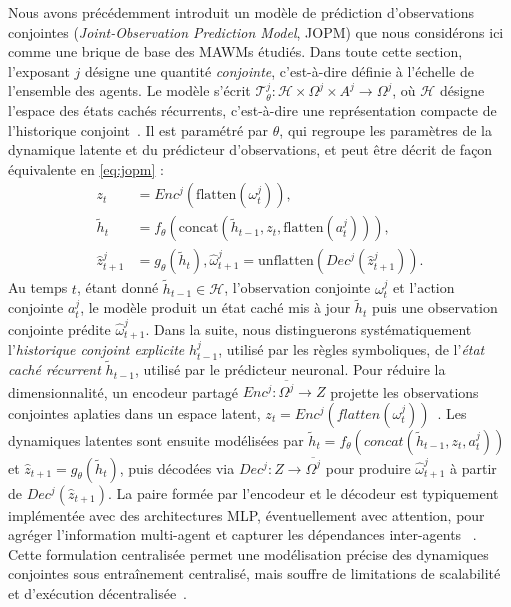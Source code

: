 \documentclass[final]{jfsma}
\theoremstyle{plain}
\theoremstyle{definition}
\theoremstyle{remark}
\begin{document}
Nous avons précédemment introduit un modèle de prédiction d'observations conjointes (\textit{Joint-Observation Prediction Model}, JOPM) que nous considérons ici comme une brique de base des MAWMs étudiés. Dans toute cette section, l'exposant $j$ désigne une quantité \emph{conjointe}, c'est-à-dire définie à l'échelle de l'ensemble des agents. Le modèle s'écrit $\mathcal{T}_{\theta}^j : \mathcal{H} \times \Omega^j \times A^j \rightarrow \Omega^j$, où $\mathcal{H}$ désigne l'espace des états cachés récurrents, c'est-à-dire une représentation compacte de l'historique conjoint~\cite{ha2018worldmodels,hafner2020dreamer}. Il est paramétré par $\theta$, qui regroupe les paramètres de la dynamique latente et du prédicteur d'observations, et peut être décrit de façon équivalente en \autoref{eq:jopm} :
%
\begin{equation}
  \label{eq:jopm}
  \begin{aligned}
    z_t             & = Enc^j(\mathrm{flatten}(\omega^j_t)),                                                     \\
    \tilde{h}_t     & = f_{\theta}\!\left(\mathrm{concat}(\tilde{h}_{t-1}, z_t, \mathrm{flatten}(a^j_t))\right), \\
    \hat{z}^j_{t+1} & = g_{\theta}(\tilde{h}_t),
    \hat{\omega}^j_{t+1} = \mathrm{unflatten}(Dec^j(\hat{z}^j_{t+1})).
  \end{aligned}
\end{equation}
%
Au temps $t$, étant donné $\tilde{h}_{t-1} \in \mathcal{H}$, l'observation conjointe $\omega_t^j$ et l'action conjointe $a_t^j$, le modèle produit un état caché mis à jour $\tilde{h}_t$ puis une observation conjointe prédite $\hat{\omega}_{t+1}^j$. Dans la suite, nous distinguerons systématiquement l'\emph{historique conjoint explicite} $h^j_{t-1}$, utilisé par les règles symboliques, de l'\emph{état caché récurrent} $\tilde{h}_{t-1}$, utilisé par le prédicteur neuronal.
%
Pour réduire la dimensionnalité, un encodeur partagé $Enc^j : \overline{\Omega^j} \rightarrow Z$ projette les observations conjointes aplaties dans un espace latent, $z_t = Enc^j(flatten(\omega_t^j))$~\cite{ha2018worldmodels,Xu2022mingling}. Les dynamiques latentes sont ensuite modélisées par $\tilde{h}_t = f_{\theta}(concat(\tilde{h}_{t-1}, z_t, a_t^j))$ et $\hat{z}_{t+1} = g_{\theta}(\tilde{h}_t)$, puis décodées via $Dec^j : Z \rightarrow \overline{\Omega^j}$ pour produire $\hat{\omega}_{t+1}^j$ à partir de $Dec^j(\hat{z}_{t+1})$.
%
La paire formée par l'encodeur et le décodeur est typiquement implémentée avec des architectures MLP, éventuellement avec attention,
pour agréger l'information multi-agent et capturer les dépendances inter-agents
~\cite{Xu2022mingling,Wang2022modelbasedmultiagentreinforcementlearning}.
Cette formulation centralisée permet une modélisation précise des dynamiques conjointes sous entraînement centralisé,
mais souffre de limitations de scalabilité et d'exécution décentralisée~\cite{Wang2022modelbasedmultiagentreinforcementlearning,Moerland2023modelbased}.
\end{document}

